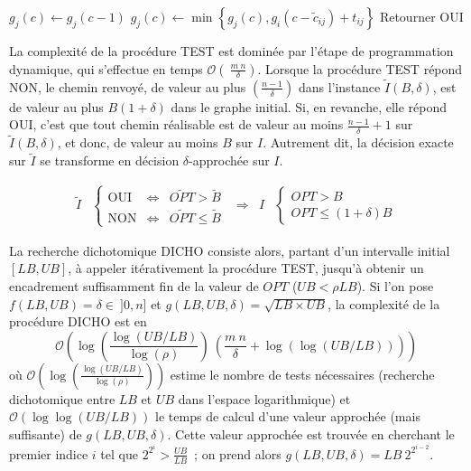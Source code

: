 \documentclass[10pt,francais]{llncs}
\begin{document}
{\begin{algorithm}
\;

\;

{
	{
	 	$g_j(c)\leftarrow g_j(c-1)$\;
		{
			{$\displaystyle{g_j(c)\leftarrow \min \left\{g_j(c),g_i(c-\tilde{c}_{ij})+t_{ij}\right\}}$}\;
		}
	}
	 \;
}
Retourner OUI
\end{algorithm}

La complexit\'e de la proc\'edure TEST est domin\'ee par l'\'etape de programmation dynamique, qui s'effectue en temps $\displaystyle \mathcal{O}(\ \frac{m\ n}{\delta})$. Lorsque la proc\'edure TEST r\'epond NON, le chemin renvoy\'e, de valeur au plus $\displaystyle \left(\frac{n-1}{\delta}\right)$ dans l'instance $\tilde{I}(B,\delta)$,  est de valeur au plus $B(1+\delta)$ dans le graphe initial. Si, en revanche, elle r\'epond OUI, c'est que tout chemin r\'ealisable est de valeur au moins $\displaystyle \frac{n-1}{\delta}+1$ sur $\tilde{I}(B,\delta)$, et donc, de valeur au moins $B$ sur $I$. Autrement dit, la d\'ecision exacte sur $\tilde{I}$ se transforme en d\'ecision $\delta$-approch\'ee sur $I$.

$$
\begin{array}{ccccc}
	\tilde{I}
	&\left\{\begin{array}{lclcl}	
		\textrm{OUI}	&\Leftrightarrow	&\widetilde{OPT} >  \tilde{B}\\
		\textrm{NON}	&\Leftrightarrow	&\widetilde{OPT}\leq  \tilde{B}
	\end{array}\right.
	&\Rightarrow
	&I
	&\left\{\begin{array}{l}	
		OPT > B\\
		OPT\leq (1+\delta)B
	\end{array}\right.
\end{array}
$$

La recherche dichotomique DICHO consiste alors, partant d'un intervalle initial $[LB,UB]$, \`a appeler it\'erativement la proc\'edure TEST, jusqu'\`a obtenir un encadrement suffisamment fin de la valeur de $OPT$ ($UB < \rho LB$). Si l'on pose $f(LB,UB)=\delta\in\ ]0,n]$ et $g(LB,UB,\delta)=\sqrt{LB\times UB}$, la complexit\'e de la proc\'edure DICHO est en 
$$\mathcal{O}\left(\log\left(\frac{\log\left(UB/LB\right)}{\log(\rho)}\right)\ \left(\frac{m\ n}{\delta} + \log\left(\log(UB/LB)\right)\right)\right)$$
o\`u $\displaystyle \mathcal{O}\left(\log\left(\frac{\log(UB/LB)}{\log(\rho)}\right)\right)$ estime le nombre de tests n\'ecessaires (recherche dichotomique entre $LB$ et $UB$ dans l'espace logarithmique) et $\mathcal{O}(\log\log(UB/LB))$ le temps de calcul d'une valeur approch\'ee (mais suffisante) de $g(LB,UB,\delta)$. Cette valeur approch\'ee est trouv\'ee en cherchant le premier indice $i$ tel que $\displaystyle 2^{2^i} > \frac{UB}{LB}$~; on prend alors $\displaystyle g(LB,UB,\delta)=LB\ 2^{2^{i-2}}$. 

}
\end{document}
